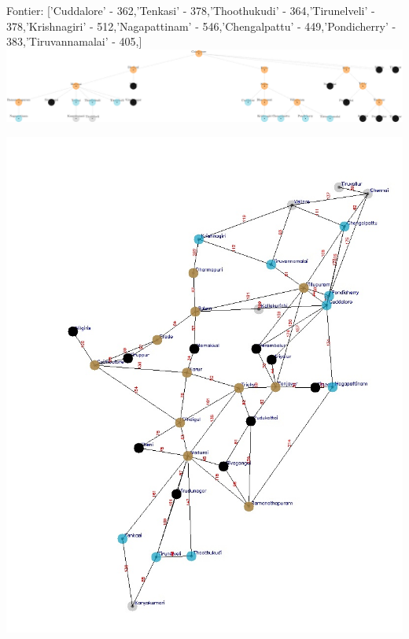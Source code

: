 \documentclass[xcolor=table]{beamer}
\begin{document}
\begin{frame}
  { \tiny Fontier: ['Cuddalore' - 362,'Tenkasi' - 378,'Thoothukudi' - 364,'Tirunelveli' - 378,'Krishnagiri' - 512,'Nagapattinam' - 546,'Chengalpattu' - 449,'Pondicherry' - 383,'Tiruvannamalai' - 405,]}
  \includegraphics[width=1\textwidth]{../UCSNodes/33-1.png}
  \begin{center}
    \includegraphics[height=0.6\textheight]{../UCSoutput/tamilUCS31.jpg}
  \end{center}
\end{frame}
\end{document}
